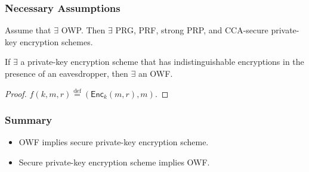 %
\begin{frame}\frametitle{Necessary Assumptions}
\begin{theorem}
Assume that $\exists$ OWP. Then $\exists$ PRG, PRF, strong PRP, and CCA-secure private-key encryption schemes.
\end{theorem}
\begin{proposition}
If $\exists$ a private-key encryption scheme that has indistinguishable encryptions in the presence of an eavesdropper, then $\exists$ an OWF.
\end{proposition}
\begin{proof}
$f(k,m,r) \overset{\text{def}}{=} (\mathsf{Enc}_k(m,r),m)$.
\end{proof}
\end{frame}
\begin{frame}\frametitle{Summary}
\begin{itemize}
\item OWF implies secure private-key encryption scheme.
\item Secure private-key encryption scheme implies OWF.
\end{itemize}
\end{frame}
